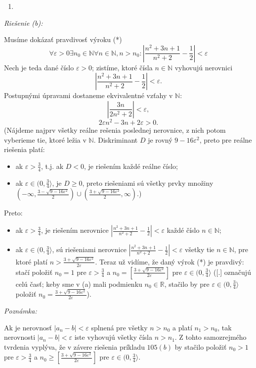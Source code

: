 \begin{enumerate}[resume]
	\item {}
\end{enumerate}

\textit{Riešenie (b):} 

Musíme dokázať pravdivosť výroku (*)
 $$\forall \varepsilon > 0 \exists n_0 \in \mathbb{N} \forall n \in \mathbb{N}, n>n_0: |\frac{n^2+3n+1}{n^2+2}-\frac{1}{2}|<\varepsilon$$
 Nech je teda dané číslo $\varepsilon > 0$; zistíme, ktoré čísla $n \in \mathbb{N}$ vyhovujú nerovnici $$|\frac{n^2+3n+1}{n^2+2}-\frac{1}{2}|<\varepsilon.$$
 Postupnými úpravami dostaneme ekvivalentné vzťahy v $\mathbb{N}:$
 $$|\frac{3n}{2n^2+2}|<\varepsilon,$$
 $$2 \varepsilon n^2-3n+2 \varepsilon >0.$$
 (Nájdeme najprv všetky reálne rešenia poslednej nerovnice, z nich potom vyberieme tie, ktoré ležia v $\mathbb{N}$. Diskriminant $D$ je rovný $9-16 \varepsilon^2$, preto pre reálne riešenia platí:
\begin{itemize}
\item ak $\varepsilon > \frac{3}{4}$, t.j. ak $D<0$, je riešením každé reálne číslo;
\item ak $\varepsilon \in (0,\frac{3}{4} \rangle$, je $D \geq 0$, preto riešeniami sú všetky prvky množiny $(-\infty,\frac{3-\sqrt{9-16\varepsilon^2}}{2}) \cup (\frac{3+\sqrt{9-16\varepsilon^2}}{2},\infty)$.)
\end{itemize} 
Preto:
\begin{itemize}
\item ak $\varepsilon > \frac{3}{4}$, je riešením nerovnice $|\frac{n^2+3n+1}{n^2+2}-\frac{1}{2}|<\varepsilon$ každé číslo $n \in \mathbb{N}$;
\item ak $\varepsilon \in (0,\frac{3}{4} \rangle$, sú riešeniami nerovnice $|\frac{n^2+3n+1}{n^2+2}-\frac{1}{2}|<\varepsilon$ všetky tie $n \in \mathbb{N}$, pre ktoré platí $n>\frac{3+\sqrt{9-16\varepsilon^2}}{2\varepsilon}$.
Teraz už vidíme, že daný výrok (*) je pravdivý: stačí položiť $n_0=1$ pre $\varepsilon>\frac{3}{4}$ a $n_0=[\frac{3+\sqrt{9-16\varepsilon^2}}{2\varepsilon}]$ pre $\varepsilon \in (0,\frac{3}{4} \rangle$ ([.] označujú celú časť; keby sme v (a) mali podmienku $n_0 \in \mathbb{R}$, stačilo by pre $\varepsilon \in (0,\frac{3}{4} \rangle$ položiť $n_0=\frac{3+\sqrt{9-16\varepsilon^2}}{2\varepsilon}$). 
\end{itemize}

\textit{Poznámka:}

Ak je nerovnosť $|a_n-b|<\varepsilon$ splnená pre všetky $n>n_0$ a platí $n_1>n_0$, tak nerovnosti $|a_n-b|<\varepsilon$ iste vyhovujú všetky čísla $n>n_1$. Z tohto samozrejmého tvrdenia vyplýva, že v závere riešenia príkladu $105 (b)$ by stačilo položiť $n_0>1$ pre $\varepsilon > \frac{3}{4}$ a $n_0 \geq [\frac{3+\sqrt{9-16\varepsilon^2}}{2\varepsilon}]$ pre $\varepsilon \in (0,\frac{3}{4}\rangle$.

